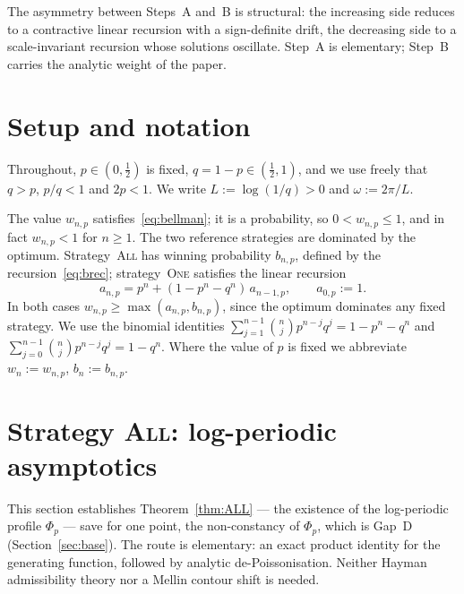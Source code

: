 \documentclass[11pt]{article}
\theoremstyle{definition}
\newcommand{\One}{\textsc{One}}
\newcommand{\All}{\textsc{All}}
\begin{document}
The asymmetry between Steps~A and~B is structural: the increasing side
reduces to a contractive linear recursion with a sign-definite drift,
the decreasing side to a scale-invariant recursion whose solutions
oscillate. Step~A is elementary; Step~B carries the analytic weight of
the paper.

\section{Setup and notation}\label{sec:setup}

Throughout, $p\in(0,\tfrac12)$ is fixed, $q=1-p\in(\tfrac12,1)$, and
we use freely that $q>p$, $p/q<1$ and $2p<1$. We write
$L:=\log(1/q)>0$ and $\omega:=2\pi/L$.

The value $w_{n,p}$ satisfies~\eqref{eq:bellman}; it is a probability,
so $0<w_{n,p}\le1$, and in fact $w_{n,p}<1$ for $n\ge1$. The two
reference strategies are dominated by the optimum. Strategy~\All{} has
winning probability $b_{n,p}$, defined by the
recursion~\eqref{eq:brec}; strategy~\One{} satisfies the linear
recursion
\begin{equation}\label{eq:arec}
  a_{n,p}=p^{n}+(1-p^{n}-q^{n})\,a_{n-1,p},\qquad a_{0,p}:=1 .
\end{equation}
In both cases $w_{n,p}\ge\max(a_{n,p},b_{n,p})$, since
the optimum dominates any fixed strategy. We use the binomial
identities $\sum_{j=1}^{n-1}\binom nj p^{n-j}q^j=1-p^n-q^n$ and
$\sum_{j=0}^{n-1}\binom nj p^{n-j}q^j=1-q^n$. Where the value of $p$
is fixed we abbreviate $w_n:=w_{n,p}$, $b_n:=b_{n,p}$.

\section{Strategy \All{}: log-periodic asymptotics}\label{sec:ALL}

This section establishes Theorem~\ref{thm:ALL} --- the existence of
the log-periodic profile $\Phi_p$ --- save for one point, the
non-constancy of $\Phi_p$, which is Gap~D (Section~\ref{sec:base}).
The route is elementary: an exact product identity for the generating
function, followed by analytic de-Poissonisation. Neither Hayman
admissibility theory nor a Mellin contour shift is needed.
\end{document}
